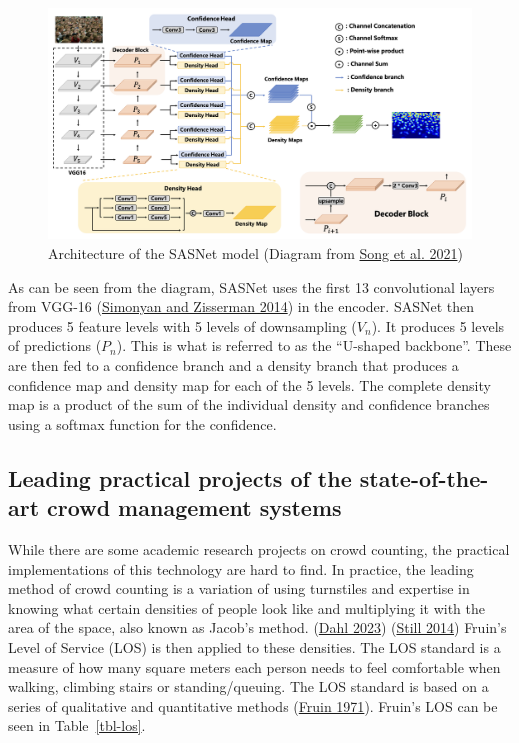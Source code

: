 \documentclass[
]{article}
\begin{document}
\begin{figure}

{\centering \includegraphics{../images/sasnet-architechture.png}

}

\caption{\label{fig-sasnet}Architecture of the SASNet model (Diagram
from \protect\hyperlink{ref-sasnet}{Song et al. 2021})}

\end{figure}

As can be seen from the diagram, SASNet uses the first 13 convolutional
layers from VGG-16 (\protect\hyperlink{ref-simonyan2014very}{Simonyan
and Zisserman 2014}) in the encoder. SASNet then produces 5 feature
levels with 5 levels of downsampling (\(V_n\)). It produces 5 levels of
predictions (\(P_n\)). This is what is referred to as the ``U-shaped
backbone''. These are then fed to a confidence branch and a density
branch that produces a confidence map and density map for each of the 5
levels. The complete density map is a product of the sum of the
individual density and confidence branches using a softmax function for
the confidence.

\hypertarget{leading-practical-projects-of-the-state-of-the-art-crowd-management-systems}{%
\subsection{Leading practical projects of the state-of-the-art crowd
management
systems}\label{leading-practical-projects-of-the-state-of-the-art-crowd-management-systems}}

While there are some academic research projects on crowd counting, the
practical implementations of this technology are hard to find. In
practice, the leading method of crowd counting is a variation of using
turnstiles and expertise in knowing what certain densities of people
look like and multiplying it with the area of the space, also known as
Jacob's method. (\protect\hyperlink{ref-dahl2023crowd}{Dahl 2023})
(\protect\hyperlink{ref-Still2014CrowdScience}{Still 2014}) Fruin's
Level of Service (LOS) is then applied to these densities. The LOS
standard is a measure of how many square meters each person needs to
feel comfortable when walking, climbing stairs or standing/queuing. The
LOS standard is based on a series of qualitative and quantitative
methods (\protect\hyperlink{ref-fruin1971pedestrian}{Fruin 1971}).
Fruin's LOS can be seen in Table~\ref{tbl-los}.
\end{document}
